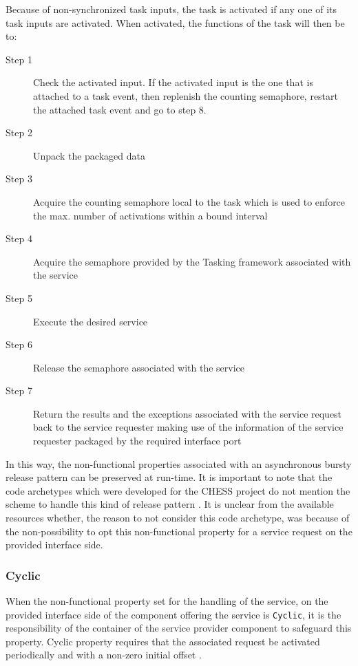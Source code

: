 Because of non-synchronized task inputs, the task is activated if any one of its task inputs are activated. When activated, the functions of the task will then be to:

\begin{description}
\item [Step 1] Check the activated input. If the activated input is the one that is attached to a task event, then replenish the counting semaphore, restart the attached task event and go to step 8. 
\item [Step 2] Unpack the packaged data
\item [Step 3] Acquire the counting semaphore local to the task which is used to enforce the max. number of activations within a bound interval
\item [Step 4] Acquire the semaphore provided by the Tasking framework associated with the service
\item [Step 5] Execute the desired service
\item [Step 6] Release the semaphore associated with the service 
\item [Step 7]Return the results and the exceptions associated with the service request back to the service requester making use of the information of the service requester packaged by the required interface port 
\end{description}

In this way, the non-functional properties associated with an asynchronous bursty release pattern can be preserved at run-time. It is important to note that the code archetypes which were developed for the CHESS project do not mention the scheme to handle this kind of release pattern \cite{CharEvoRAVCodeAr,EvoRAVCodeAr}. It is unclear from the available resources whether, the reason to not consider this code archetype, was because of the non-possibility to opt this non-functional property for a service request on the provided interface side.

\subsubsection{\textbf{Cyclic}} 
When the non-functional property set for the handling of the service, on the provided interface side of the component offering the service is \texttt{Cyclic}, it is the responsibility of the container of the service provider component to safeguard this property. Cyclic property requires that the associated request be activated periodically and with a non-zero initial offset \cite{SpecMetamodel,CompBasedProcess}. 

